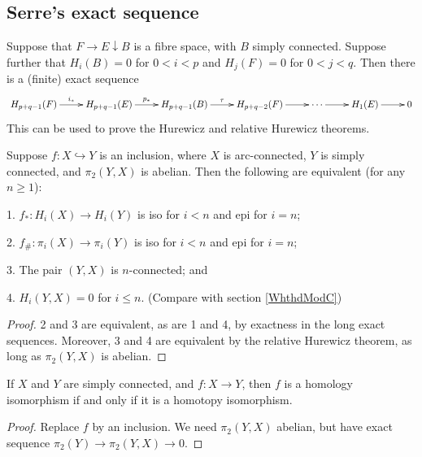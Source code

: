 \documentclass[11pt]{article}
\begin{document}
\subsection{Serre's exact sequence}
Suppose that $F\rightarrow E\downarrow B$ is a fibre space, with $B$ simply connected. Suppose further that $H_i(B)=0$ for $0<i<p$ and $H_j(F)=0$ for $0<j<q$. Then there is a (finite) exact sequence
\[\xymatrix{
H_{p+q-1}(F)\ar[r]^{i_*}&H_{p+q-1}(E)\ar[r]^{p_*}&H_{p+q-1}(B)\ar[r]^{\tau}&H_{p+q-2}(F)\ar[r]&\cdots\ar[r]&H_1(E)\ar[r]&0
}\]
This can be used to prove the Hurewicz and relative Hurewicz theorems.
\begin{thm*}\label{Whthd}
Suppose $f:X\hookrightarrow Y$ is an inclusion, where $X$ is arc-connected, $Y$ is simply connected, and $\pi_2(Y,X)$ is abelian. Then the following are equivalent (for any $n\geq1$):
\begin{itemise}
\item[1.] $f_*:H_i(X)\to H_i(Y)$ is iso for $i<n$ and epi for $i=n$;
\item[2.] $f_\#:\pi_i(X)\to \pi_i(Y)$ is iso for $i<n$ and epi for $i=n$;
\item[3.] The pair $(Y,X)$ is $n$-connected; and
\item[4.] $H_i(Y,X)=0$ for $i\leq n$. \hfill (Compare with section \ref{WhthdModC})
\end{itemise}
\end{thm*}
\begin{proof}
2 and 3 are equivalent, as are 1 and 4, by exactness in the long exact sequences. Moreover, 3 and 4 are equivalent by the relative Hurewicz theorem, as long as $\pi_2(Y,X)$ is abelian.
\end{proof}
\begin{cor*} If $X$ and $Y$ are simply connected, and $f:X\to Y$, then $f$ is a homology isomorphism if and only if it is a homotopy isomorphism.
\begin{proof}
Replace $f$ by an inclusion. We need $\pi_2(Y,X)$ abelian, but have exact sequence $\pi_2(Y)\to\pi_2(Y,X)\to0$.
\end{proof}
\end{cor*}
\setcounter{subsection}{5}
\end{document}
